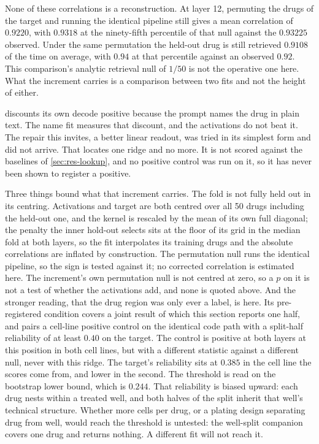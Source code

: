 None of these correlations is a reconstruction. At layer 12, permuting the drugs
of the target and running the identical pipeline still gives a mean correlation
of $0.9220$, with $0.9318$ at the ninety-fifth percentile of that null against
the $0.93225$ observed. Under the same permutation the held-out drug is still
retrieved $0.9108$ of the time on average, with $0.94$ at that percentile
against an observed $0.92$. This comparison's analytic retrieval null of $1/50$
is not the operative one here. What the increment carries is a comparison
between two fits and not the height of either.

 discounts its own decode positive because the prompt
names the drug in plain text. The name fit measures that discount, and the
activations do not beat it. The repair this invites, a better linear readout,
was tried in its simplest form and did not arrive. That locates one ridge and no
more. It is not scored against the baselines of \cref{sec:res-lookup}, and no
positive control was run on it, so it has never been shown to register a
positive.

\begin{scopelimit}
Three things bound what that increment carries. The fold is not fully held out
in its centring. Activations and target are both centred over all \num{50} drugs
including the held-out one, and the kernel is rescaled by the mean of its own
full diagonal; the penalty the inner hold-out selects sits at the floor of its
grid in the median fold at both layers, so the fit interpolates its training
drugs and the absolute correlations are inflated by construction. The
permutation null runs the identical pipeline, so the sign is tested against it;
no corrected correlation is estimated here. The increment's own permutation null
is not centred at zero, so a $p$ on it is not a test of whether the activations
add, and none is quoted above. And the stronger reading, that the drug region
was only ever a label, is \notestablished here. Its pre-registered condition
covers a joint result of which this section reports one half, and pairs a
cell-line positive control on the identical code path with a split-half
reliability of at least $0.40$ on the target. The control is positive at both
layers at this position in both cell lines, but with a different statistic
against a different null, never with this ridge. The target's reliability sits
at $0.385$ in the cell line the scores come from, and lower in the second. The
threshold is read on the bootstrap lower bound, which is $0.244$. That
reliability is biased upward: each drug nests within a treated well, and both
halves of the split inherit that well's technical structure. Whether more cells
per drug, or a plating design separating drug from well, would reach the
threshold is untested: the well-split companion covers one drug and returns
nothing. A different fit will not reach it.
\end{scopelimit}

